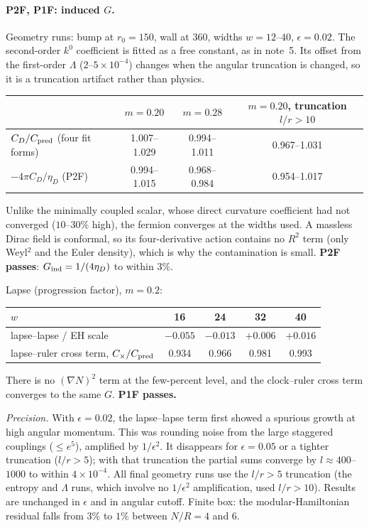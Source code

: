 \documentclass[11pt]{article}
\begin{document}
\paragraph{P2F, P1F: induced $G$.} Geometry runs: bump at $r_0=150$, wall at $360$, widths $w=12$--$40$, $\epsilon=0.02$. The second-order $k^0$ coefficient is fitted as a free constant, as in note~5. Its offset from the first-order $\Lambda$ ($2$--$5\times10^{-4}$) changes when the angular truncation is changed, so it is a truncation artifact rather than physics.
\begin{center}\small\begin{tabular}{lccc}\toprule
& $m=0.20$ & $m=0.28$ & $m=0.20$, truncation $l/r>10$\\\midrule
$C_D/C_{\rm pred}$ (four fit forms) & 1.007--1.029 & 0.994--1.011 & 0.967--1.031\\
$-4\pi C_D/\eta_D$ (P2F) & 0.994--1.015 & 0.968--0.984 & 0.954--1.017\\\bottomrule\end{tabular}\end{center}
Unlike the minimally coupled scalar, whose direct curvature coefficient had not converged ($10$--$30\%$ high), the fermion converges at the widths used. A massless Dirac field is conformal, so its four-derivative action contains no $R^2$ term (only Weyl$^2$ and the Euler density), which is why the contamination is small. \textbf{P2F passes}: $G_{\rm ind}=1/(4\eta_D)$ to within $3\%$.

Lapse (progression factor), $m=0.2$:
\begin{center}\small\begin{tabular}{lcccc}\toprule
$w$ & 16 & 24 & 32 & 40\\\midrule
lapse--lapse / EH scale & $-0.055$ & $-0.013$ & $+0.006$ & $+0.016$\\
lapse--ruler cross term, $C_\times/C_{\rm pred}$ & 0.934 & 0.966 & 0.981 & 0.993\\\bottomrule\end{tabular}\end{center}
There is no $(\nabla N)^2$ term at the few-percent level, and the clock--ruler cross term converges to the same $G$. \textbf{P1F passes.}

\emph{Precision.} With $\epsilon=0.02$, the lapse--lapse term first showed a spurious growth at high angular momentum. This was rounding noise from the large staggered couplings ($\le e^{5}$), amplified by $1/\epsilon^2$. It disappears for $\epsilon=0.05$ or a tighter truncation ($l/r>5$); with that truncation the partial sums converge by $l\approx400$--$1000$ to within $4\times10^{-4}$. All final geometry runs use the $l/r>5$ truncation (the entropy and $\Lambda$ runs, which involve no $1/\epsilon^2$ amplification, used $l/r>10$). Results are unchanged in $\epsilon$ and in angular cutoff. Finite box: the modular-Hamiltonian residual falls from $3\%$ to $1\%$ between $N/R=4$ and $6$.
\end{document}
